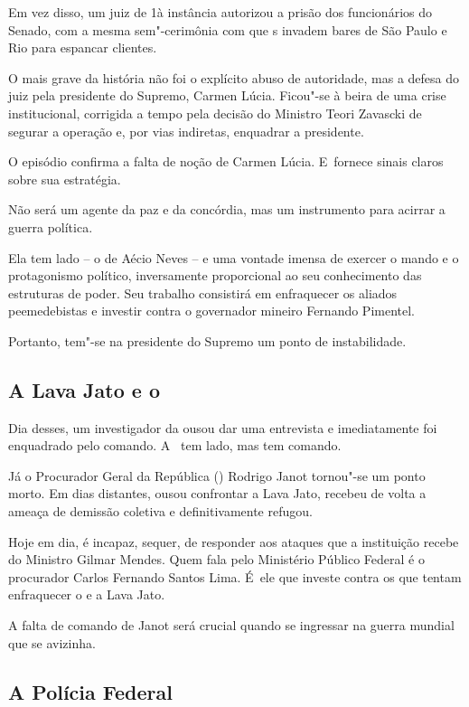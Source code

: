 Em vez disso, um juiz de 1à instância autorizou a prisão dos
funcionários do Senado, com a mesma sem"-cerimônia com que s invadem
bares de São Paulo e Rio para espancar clientes.

O mais grave da história não foi o explícito abuso de autoridade, mas a
defesa do juiz pela presidente do Supremo, Carmen Lúcia. Ficou"-se à
beira de uma crise institucional, corrigida a tempo pela decisão do
Ministro Teori Zavascki de segurar a operação e, por vias indiretas,
enquadrar a presidente.

O episódio confirma a falta de noção de Carmen Lúcia. E~fornece sinais
claros sobre sua estratégia.

Não será um agente da paz e da concórdia, mas um instrumento para
acirrar a guerra política.

Ela tem lado -- o de Aécio Neves -- e uma vontade imensa de exercer o
mando e o protagonismo político, inversamente proporcional ao seu
conhecimento das estruturas de poder. Seu trabalho consistirá em
enfraquecer os aliados peemedebistas e investir contra o governador
mineiro Fernando Pimentel.

Portanto, tem"-se na presidente do Supremo um ponto de instabilidade.

\subsection{A Lava Jato e o }

Dia desses, um investigador da  ousou dar uma entrevista e
imediatamente foi enquadrado pelo comando. A~ tem lado, mas tem
comando.

Já o Procurador Geral da República () Rodrigo Janot tornou"-se um
ponto morto. Em dias distantes, ousou confrontar a Lava Jato, recebeu de
volta a ameaça de demissão coletiva e definitivamente refugou.

Hoje em dia, é incapaz, sequer, de responder aos ataques que a
instituição recebe do Ministro Gilmar Mendes. Quem fala pelo Ministério
Público Federal é o procurador Carlos Fernando Santos Lima. É~ele que
investe contra os que tentam enfraquecer o  e a Lava Jato.

A falta de comando de Janot será crucial quando se ingressar na guerra
mundial que se avizinha.

\subsection{A Polícia Federal}

